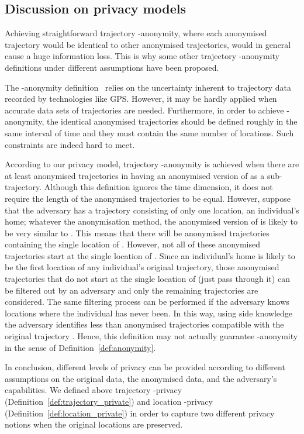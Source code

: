 \subsection{Discussion on privacy models}

Achieving straightforward
trajectory -anonymity, where each anonymised trajectory would
be identical to  other anonymised trajectories, would in general
cause a huge information loss.
This is why some other trajectory -anonymity definitions
under different assumptions have been proposed.

The -anonymity definition~\cite{abul08, abul10}
relies on the uncertainty inherent to trajectory data recorded by
technologies like GPS. However, it may be hardly applied
when accurate data sets of trajectories are needed. Furthermore,
in order to achieve -anonymity, the  identical
anonymised trajectories should be defined roughly in the
same interval of time and they must contain the same number of locations.
Such constraints are indeed hard to meet.

According to our privacy model, trajectory -anonymity
is achieved when there are at least  anonymised trajectories
in  having an anonymised version of 
as a sub-trajectory. Although this definition ignores the
time dimension, it does not require the length of the 
anonymised trajectories to be equal. However, suppose
that the adversary has a trajectory  consisting of only one
location, an individual's home;
whatever the anonymisation method,
the anonymised version of  is likely to be very similar to .
This means that there
will be  anonymised trajectories
containing the single location of .
However, not all of these anonymised
trajectories start at the single location of . Since an individual's home
is likely to be the first location of any individual's original
trajectory, those anonymised trajectories that do not start at the single
location of  (just pass through it) can be filtered out by an adversary
and only the remaining trajectories are considered.
The same filtering process can be performed if the adversary
knows locations where the individual has never been. In this way, using
side knowledge the adversary identifies less than  anonymised
trajectories compatible with the original trajectory .
Hence, this definition may not actually guarantee -anonymity
in the sense of Definition~\ref{def:anonymity}.

In conclusion, different levels of privacy can be provided
according to different assumptions on the
original data, the anonymised data, and the adversary's capabilities.
We defined above trajectory -privacy
(Definition~\ref{def:trajectory_private})
and location -privacy (Definition~\ref{def:location_private})
in order to capture two different privacy notions
when the original locations are preserved.

